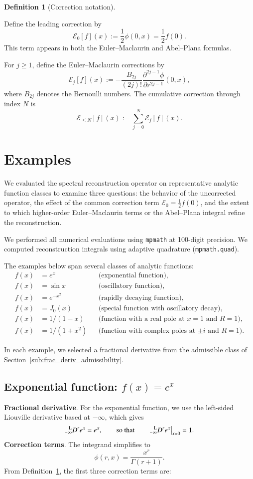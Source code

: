 \documentclass[preprint, 12pt]{elsarticle}
\theoremstyle{definition}
\newtheorem{definition}{Definition}[section]
\theoremstyle{plain}
\theoremstyle{remark}
\begin{document}
\begin{definition}[Correction notation]
\label{def:correction_series}

Define the leading correction by
\[
\mathcal E_0[f](x)
:=
\frac12 \phi(0,x)
=
\frac12 f(0).
\]
This term appears in both the Euler--Maclaurin and Abel--Plana formulas.

For $j\geq 1$, define the Euler--Maclaurin corrections by
\[
\mathcal E_j[f](x)
:=
-\frac{B_{2j}}{(2j)!}
\frac{\partial^{2j-1}\phi}{\partial r^{2j-1}}(0,x),
\]
where $B_{2j}$ denotes the Bernoulli numbers. The cumulative correction through index $N$ is
\[
\mathcal E_{\leq N}[f](x)
:=
\sum_{j=0}^{N}\mathcal E_j[f](x).
\]
\end{definition}

\section{Examples}
\label{sec:examples}
We evaluated the spectral reconstruction operator on representative analytic function classes to examine three questions: the behavior of the uncorrected operator, the effect of the common correction term $\mathcal{E}_0 = \frac12 f(0)$, and the extent to which higher-order Euler--Maclaurin terms or the Abel--Plana integral refine the reconstruction.

We performed all numerical evaluations using \texttt{mpmath} at 100-digit precision. We computed reconstruction integrals using adaptive quadrature (\texttt{mpmath.quad}).

The examples below span several classes of analytic functions:
\[
\begin{aligned}
f(x) &= e^x && \text{(exponential function)},\\
f(x) &= \sin x && \text{(oscillatory function)},\\
f(x) &= e^{-x^2} && \text{(rapidly decaying function)},\\
f(x) &= J_0(x) && \text{(special function with oscillatory decay)},\\
f(x) &= 1/(1-x) && \text{(function with a real pole at $x=1$ and $R=1$)},\\
f(x) &= 1/(1+x^2) && \text{(function with complex poles at $\pm i$ and $R=1$)}.
\end{aligned}
\]

In each example, we selected a fractional derivative from the admissible class of Section~\ref{sub:frac_deriv_admissibility}.

\subsection{Exponential function: $f(x)=e^x$}
\textbf{Fractional derivative}. For the exponential function, we use the left-sided Liouville derivative based at $-\infty$, which gives
\[
\prescript{\mathrm{L}}{-\infty}{D}^{r} e^{x}=e^{x},
\qquad\text{so that}\qquad
\prescript{\mathrm{L}}{-\infty}{D}^{r} e^{x}\big|_{x=0} = 1.
\]
\textbf{Correction terms}. The integrand simplifies to
\[
\phi(r,x) = \frac{x^{r}}{\Gamma(r+1)}.
\]
From Definition~\ref{def:correction_series}, the first three correction terms are:
\end{document}
